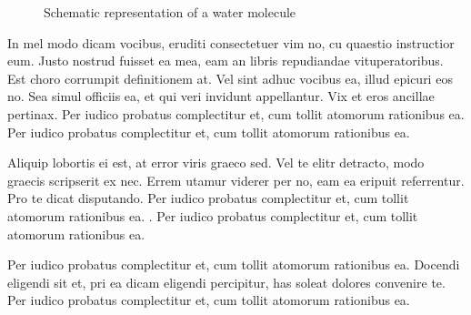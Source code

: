 \begin{figure}[hbt]
  \begin{center}
  \end{center}
  \caption{Schematic representation of a water molecule}
  \label{CHAPTER1_FIG03}
\end{figure}

In mel modo dicam vocibus, eruditi consectetuer vim no, cu quaestio 
instructior eum. Justo nostrud fuisset ea mea, eam an libris repudiandae 
vituperatoribus. Est choro corrumpit definitionem at. Vel sint adhuc vocibus 
ea, illud epicuri eos no. Sea simul officiis ea, et qui veri invidunt 
appellantur. Vix et eros ancillae pertinax. 
\cite{GROMACS4,GULP_01,GULP_02,HYPRE_01,LAMMPS_01}
Per iudico probatus complectitur et, cum tollit atomorum rationibus ea.
Per iudico probatus complectitur et, cum tollit atomorum rationibus ea.

Aliquip lobortis ei est, at error viris graeco sed. Vel te elitr detracto, 
modo graecis scripserit ex nec. Errem utamur viderer per no, eam ea eripuit 
referrentur. Pro te dicat disputando. Per iudico probatus complectitur et, 
cum tollit atomorum rationibus ea. \cite{R_01,SIESTA_01,SIESTA_02,SMEAGOL_01}.
Per iudico probatus complectitur et, cum tollit atomorum rationibus ea.

Per iudico probatus complectitur et, cum tollit atomorum rationibus ea.
Docendi eligendi sit et, pri ea dicam eligendi percipitur, has soleat 
dolores convenire te. Per iudico probatus complectitur et, cum tollit 
atomorum rationibus ea.
